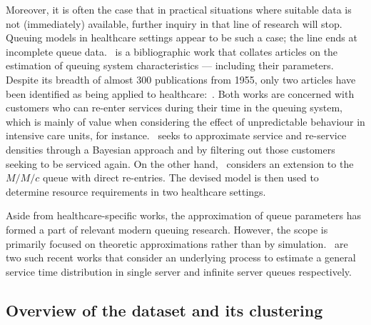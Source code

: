 Moreover, it is often the case that in practical situations where suitable data
is not (immediately) available, further inquiry in that line of research will
stop. Queuing models in healthcare settings appear to be such a case; the line
ends at incomplete queue data.~\cite{Asanjarani2017} is a bibliographic work
that collates articles on the estimation of queuing system characteristics ---
including their parameters. Despite its breadth of almost 300 publications from
1955, only two articles have been identified as being applied to
healthcare:~\cite{Mohammadi2012,Yom2014}. Both works are concerned with
customers who can re-enter services during their time in the queuing system,
which is mainly of value when considering the effect of unpredictable behaviour
in intensive care units, for instance.~\cite{Mohammadi2012} seeks to approximate
service and re-service densities through a Bayesian approach and by filtering
out those customers seeking to be serviced again. On the other
hand,~\cite{Yom2014} considers an extension to the \(M/M/c\) queue with direct
re-entries. The devised model is then used to determine resource requirements in
two healthcare settings.

Aside from healthcare-specific works, the approximation of queue parameters has
formed a part of relevant modern queuing research. However, the scope is
primarily focused on theoretic approximations rather than by
simulation.~\cite{Djabali2018,Goldenshluger2016} are two such recent works that
consider an underlying process to estimate a general service time distribution
in single server and infinite server queues respectively.

\subsection{Overview of the dataset and its clustering}\label{subsec:overview}

